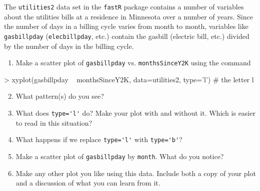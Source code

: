 \begin{problem}
The \verb!utilities2! data set in the \verb!fastR! package contains a number of variables
about the utilities bills at a residence in Minnesota over a number of years.
Since the number of days in a billing cycle varies from month to month, variables 
like \verb!gasbillpday! (\verb!elecbillpday!, etc.) contain the gasbill (electric bill, etc.) 
divided by the number of days in the billing cycle.
\begin{enumerate}
\item
Make a scatter plot of \verb!gasbillpday! vs. \verb!monthsSinceY2K! using the command
\end{enumerate}

\begin{Schunk}
\begin{Sinput}
> xyplot(gasbillpday ~ monthsSinceY2K, data=utilities2, type='l')   # the letter l
\end{Sinput}
\end{Schunk}
\vspace{-6mm}
\begin{enumerate}
\setcounter{enumi}{1}
\item[]
What pattern(s) do you see?
\item
What does \verb!type='l'! do?  Make your plot with and without it.  Which is easier to read
in this situation?
\item
What happens if we replace 
\verb!type='l'! with 
\verb!type='b'!?
\item
Make a scatter plot of \verb!gasbillpday! by \verb!month!.   
What do you notice?

\item
Make any other plot you like using this data.  Include both a copy of your plot and a 
discussion of what you can learn from it.
\end{enumerate}
\end{problem}

